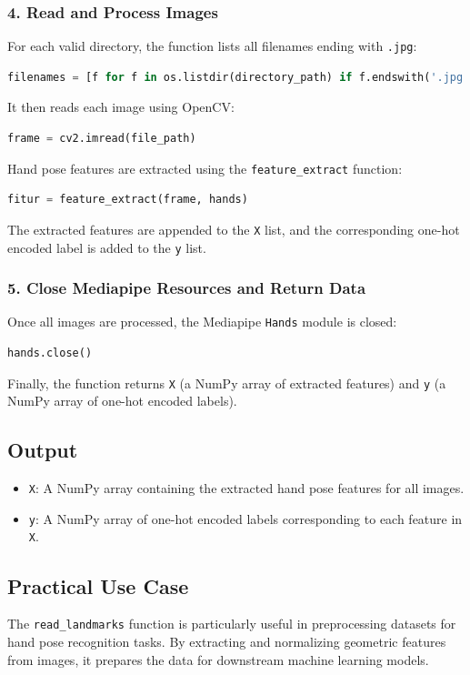 \subsubsection*{4. Read and Process Images}
For each valid directory, the function lists all filenames ending with \texttt{.jpg}:
\begin{lstlisting}[language=Python]
	filenames = [f for f in os.listdir(directory_path) if f.endswith('.jpg')]
\end{lstlisting}
It then reads each image using OpenCV:
\begin{lstlisting}[language=Python]
	frame = cv2.imread(file_path)
\end{lstlisting}
Hand pose features are extracted using the \texttt{feature\_extract} function:
\begin{lstlisting}[language=Python]
	fitur = feature_extract(frame, hands)
\end{lstlisting}
The extracted features are appended to the \texttt{X} list, and the corresponding one-hot encoded label is added to the \texttt{y} list.

\subsubsection*{5. Close Mediapipe Resources and Return Data}
Once all images are processed, the Mediapipe \texttt{Hands} module is closed:
\begin{lstlisting}[language=Python]
	hands.close()
\end{lstlisting}
Finally, the function returns \texttt{X} (a NumPy array of extracted features) and \texttt{y} (a NumPy array of one-hot encoded labels).

\subsection*{Output}
\begin{itemize}
	\item \texttt{X}: A NumPy array containing the extracted hand pose features for all images.
	\item \texttt{y}: A NumPy array of one-hot encoded labels corresponding to each feature in \texttt{X}.
\end{itemize}

\subsection*{Practical Use Case}
The \texttt{read\_landmarks} function is particularly useful in preprocessing datasets for hand pose recognition tasks. By extracting and normalizing geometric features from images, it prepares the data for downstream machine learning models.


